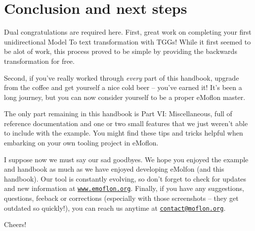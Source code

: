 \newpage
\section{Conclusion and next steps}
\genHeader

Dual congratulations are required here. First, great work on completing your first unidirectional Model To text transformation with TGGs! While it first seemed
to be alot of work, this process proved to be simple by providing the backwards transformation for free.

Second, if you've really worked through \emph{every} part of this handbook, upgrade from the coffee and get yourself a nice cold beer -- you've earned it! It's
been a long journey, but you can now consider yourself to be a proper eMoflon master.

The only part remaining in this handbook is Part VI: Miscellaneous, full of reference documentation and one or two small features that we just weren't able to
include with the example. You might find these tips and tricks helpful when embarking on your own tooling project in eMoflon.

I suppose now we must say our sad goodbyes. We hope you enjoyed the example and handbook as much as we have enjoyed developing eMolfon (and this handbook). Our
tool is constantly evolving, so don't forget to check for updates and new information at \texttt{\url{www.emoflon.org}}. Finally, if you have any suggestions,
questions, feeback or corrections (especially with those screenshots -- they get outdated so quickly!), you can reach us anytime at
\texttt{\href{mailto:contact@moflon.org}{contact@moflon.org}}.

Cheers!
